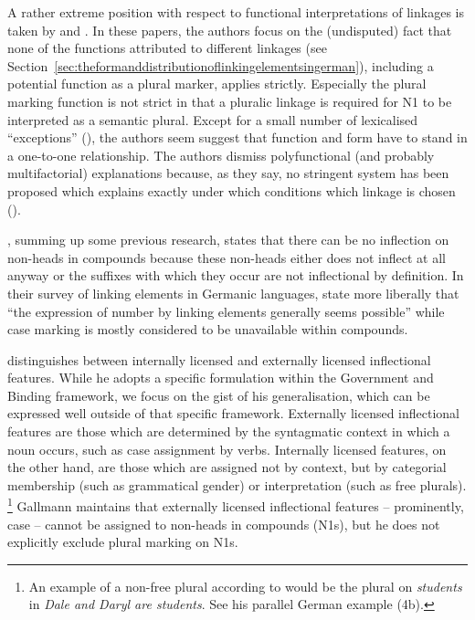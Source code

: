 A rather extreme position with respect to functional interpretations of linkages is taken by \textcite{NeefBorgwaldt2012} and \textcite{Neef2015}.
In these papers, the authors focus on the (undisputed) fact that none of the functions attributed to different linkages (see Section~\ref{sec:theformanddistributionoflinkingelementsingerman}), including a potential function as a plural marker, applies strictly.
Especially the plural marking function is not strict in that a pluralic linkage is required for N1 to be interpreted as a semantic plural.
Except for a small number of lexicalised ``exceptions'' (\egg \citealt[42]{NeefBorgwaldt2012}), the authors seem suggest that function and form have to stand in a one-to-one relationship.
The authors dismiss polyfunctional (and probably multifactorial) explanations because, as they say, no stringent system has been proposed which explains exactly under which conditions which linkage is chosen (\egg \citealt[27--29]{NeefBorgwaldt2012}).

\textcite[9]{Schluecker2012}, summing up some previous research, states that there can be no inflection on non-heads in compounds because these non-heads either does not inflect at all anyway or the suffixes with which they occur are not inflectional by definition.
In their survey of linking elements in Germanic languages, \textcite[577]{FuhrhopKuerschner2015} state more liberally that ``the expression of number by linking elements generally seems possible'' while case marking is mostly considered to be unavailable within compounds.

\textcite[178--180]{Gallmann1998} distinguishes between internally licensed and externally licensed inflectional features.
While he adopts a specific formulation within the Government and Binding framework, we focus on the gist of his generalisation, which can be expressed well outside of that specific framework.
Externally licensed inflectional features are those which are determined by the syntagmatic context in which a noun occurs, such as case assignment by verbs.
Internally licensed features, on the other hand, are those which are assigned not by context, but by categorial membership (such as grammatical gender) or interpretation (such as free plurals).%
\footnote{An example of a non-free plural according to \textcite[179]{Gallmann1998} would be the plural on \textit{students} in \textit{Dale and Daryl are students}.
See his parallel German example (4b).
}
Gallmann maintains that externally licensed inflectional features -- prominently, case -- cannot be assigned to non-heads in compounds (N1s), but he does not explicitly exclude plural marking on N1s.

